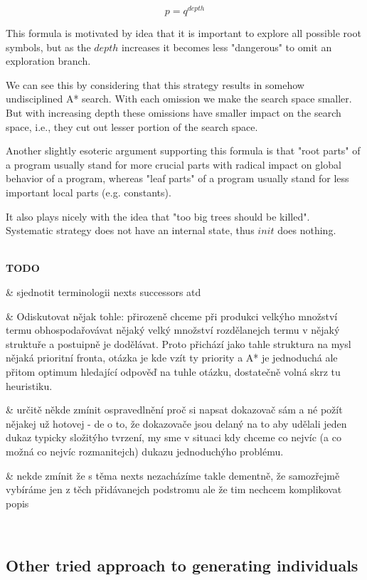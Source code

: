\documentclass[12pt,a4paper]{report}
\newenvironment{todo}
{ ~\\[0.5em]
  {\color{red}\textbf{TODO}}
  \begin{easylist}[itemize]}
{ \end{easylist}
  ~}
\begin{document}
$$ p = q^{depth} $$
   
This formula is motivated by idea that it is important to
explore all possible root symbols, but as the $depth$ 
increases it becomes less "dangerous" to omit 
an exploration branch. 

We can see this by considering that this strategy results in
somehow undisciplined A* search.
With each omission we make the search space smaller. But with
increasing depth these omissions have smaller impact on the search space,
i.e., they cut out lesser portion of the search space.

Another slightly esoteric argument supporting this formula is that "root 
parts" of a program usually stand for more crucial parts
with radical impact on global behavior of a program, 
whereas "leaf parts" of a program usually
stand for less important local parts (e.g. constants).  

It also plays nicely with the idea that "too big trees should be killed".\\



Systematic strategy does not have an internal state, thus $init$ does nothing.



\begin{todo}
 
& sjednotit terminologii nexts successors atd
 
& Odiskutovat nějak tohle:
přirozeně chceme při produkci velkýho množství termu obhospodařovávat nějaký
velký množství rozdělanejch termu v nějaký struktuře a postuipně je dodělávat.
Proto přichází jako tahle struktura na mysl nějaká prioritní fronta,
otázka je kde vzít ty priority a A* je jednoduchá ale přitom optimum hledající 
odpověď na tuhle otázku, dostatečně volná skrz tu heuristiku.  

& určitě někde zmínit ospravedlnění proč si napsat dokazovač sám
a né požít nějakej už hotovej - de o to, že dokazovače jsou delaný na to aby
udělali jeden dukaz typicky složitýho tvrzení, my sme v situaci kdy
chceme co nejvíc (a co možná co nejvíc rozmanitejch) dukazu jednoduchýho problému. 

& nekde zmínit že s těma nexts nezacházíme takle dementně, že samozřejmě vybíráme 
jen z těch přidávanejch podstromu ale že tim nechcem komplikovat popis 
 
\end{todo}


\subsection{Other tried approach to generating individuals}
\end{document}

